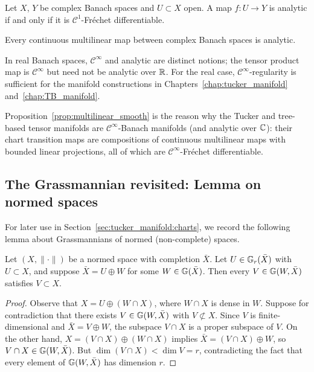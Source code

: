 \begin{proposition}[{\cite[Theorem~160]{HJ2012}}]
\label{prop:analytic_c1}
Let $X$, $Y$ be complex Banach spaces and $U \subset X$ open. A map
$f: U \to Y$ is analytic if and only if it is $\mathcal{C}^1$-Fréchet
differentiable.
\end{proposition}

\begin{corollary}
\label{cor:multilinear_analytic}
Every continuous multilinear map between complex Banach spaces is analytic.
\end{corollary}

In real Banach spaces, $\mathcal{C}^\infty$ and analytic are distinct
notions; the tensor product map is $\mathcal{C}^\infty$ but need not be
analytic over $\mathbb{R}$. For the real case, $\mathcal{C}^\infty$-regularity
is sufficient for the manifold constructions in Chapters~\ref{chap:tucker_manifold}
and~\ref{chap:TB_manifold}.

\begin{remark}
\label{rem:regularity_manifold}
Proposition~\ref{prop:multilinear_smooth} is the reason why the Tucker
and tree-based tensor manifolds are $\mathcal{C}^\infty$-Banach manifolds
(and analytic over $\mathbb{C}$): their chart transition maps are compositions of
continuous multilinear maps with bounded linear projections, all of which
are $\mathcal{C}^\infty$-Fréchet differentiable.
\end{remark}

\subsection*{The Grassmannian revisited: Lemma on normed spaces}

For later use in Section~\ref{sec:tucker_manifold:charts}, we record
the following lemma about Grassmannians of normed (non-complete) spaces.

\begin{lemma}
\label{lem:normed_grassmann}
Let $(X, \|\cdot\|)$ be a normed space with completion $\bar X$. Let
$U \in \mathbb{G}_{r}(\bar X)$ with $U \subset X$, and suppose
$\bar X = U \oplus W$ for some $W \in \mathbb{G}(\bar X)$. Then every
$V \in \mathbb{G}(W, \bar X)$ satisfies $V \subset X$.
\end{lemma}

\begin{proof}
Observe that $X = U \oplus (W \cap X)$, where $W \cap X$ is dense in $W$.
Suppose for contradiction that there exists $V \in \mathbb{G}(W, \bar X)$
with $V \not\subset X$. Since $V$ is finite-dimensional and $\bar X =
V \oplus W$, the subspace $V \cap X$ is a proper subspace of $V$. On
the other hand, $X = (V \cap X) \oplus (W \cap X)$ implies $\bar X =
(V \cap X) \oplus W$, so $V \cap X \in \mathbb{G}(W, \bar X)$. But
$\dim(V \cap X) < \dim V = r$, contradicting the fact that every element
of $\mathbb{G}(W, \bar X)$ has dimension $r$.
\end{proof}


